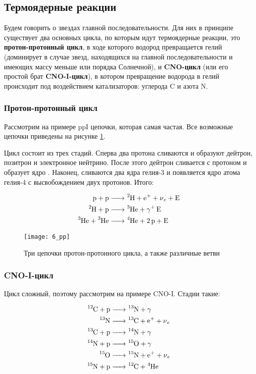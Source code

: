 \subsection{Термоядерные реакции}

Будем говорить о звездах главной последовательности. Для них в принципе существует два основных цикла, по которым идут термоядерные реакции, это \textbf{протон-протонный цикл}, в ходе которого водород превращается гелий (доминирует в случае звезд, находящихся на главной последовательности и имеющих массу меньше или порядка Солнечной), и \textbf{CNO-цикл} (или его простой брат \textbf{CNO-I-цикл}), в котором превращение водорода в гелий происходит под воздействием катализаторов: углерода C и азота N.

\subsubsection{Протон-протонный цикл}

Рассмотрим на примере pp\RN{1} цепочки, которая самая частая. Все возможные цепочки приведены на рисунке \ref{fig:6_pp}.

Цикл состоит из трех стадий. Сперва два протона сливаются и образуют дейтрон, позитрон и электронное нейтрино. После этого дейтрон сливается с протоном и образует ядро . Наконец, сливаются два ядра гелия-3 и появляется ядро атома гелия-4 с высвобождением двух протонов. Итого:

\begin{align}
	\ce{p + p &-> ^2H + e^+ + \nu_e + E}\\
	\ce{^2H + p &-> ^3He + \gamma + E}\\
	\ce{^3He + ^3He &-> ^4He + 2p + E}
\end{align}

\begin{figure}[H]
	\centering
	\texttt{[image: 6\_pp]}
	\caption{Три цепочки протон-протонного цикла, а также различные ветви}
	\label{fig:6_pp}
\end{figure}

\subsubsection{CNO-I-цикл}

Цикл сложный, поэтому рассмотрим на примере CNO-\RN{1}. Стадии такие:

\begin{align}
	\ce{^{12}C + p &-> ^{13}N + \gamma}\\
	\ce{^{13}N &-> ^{13}C + e^+ + \nu_e}\\
	\ce{^{13}C + p &-> ^{14}N + \gamma}\\
	\ce{^{14}N + p &-> ^{15}O + \gamma}\\
	\ce{^{15}O &-> ^{15}N + e^+ + \nu_e}\\
	\ce{^{15}N + p &-> ^{12}C + ^4He}
\end{align}

